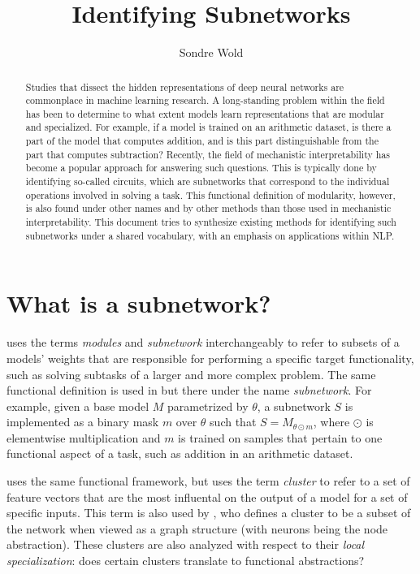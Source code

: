 \documentclass[11pt]{article}
\title{Identifying Subnetworks}
\author{Sondre Wold}
\begin{document}
\maketitle

\begin{abstract}
\noindent
Studies that dissect the hidden representations of deep neural networks are commonplace in machine learning research. A long-standing problem within the field has been to determine to what extent models learn representations that are modular and specialized. For example, if a model is trained on an arithmetic dataset, is there a part of the model that computes addition, and is this part  distinguishable from the part that computes subtraction? Recently, the field of mechanistic interpretability has become a popular approach for answering such questions. This is typically done by identifying so-called circuits, which are subnetworks that correspond to the individual operations involved in solving a task. This functional definition of modularity, however, is also found under other names and by other methods than those used in mechanistic interpretability. This document tries to synthesize existing methods for identifying such subnetworks under a shared vocabulary, with an emphasis on applications within NLP.
\end{abstract}

\section{What is a subnetwork?}

\citet{csordas2020neural} uses the terms \textit{modules} and \textit{subnetwork} interchangeably to refer to subsets of a models' weights that are responsible for performing a specific target functionality, such as solving subtasks of a larger and more complex problem. The same functional definition is used in \citet{lepori2023break} but there under the name \textit{subnetwork}. For example, given a base model $M$ parametrized by $\theta$, a subnetwork $S$ is implemented as a binary mask $m$ over $\theta$ such that $S=M_{\theta \odot m}$, where $\odot$ is elementwise multiplication and $m$ is trained on samples that pertain to one functional aspect of a task, such as addition in an arithmetic dataset.

\citet{watanabe2019interpreting} uses the same functional framework, but uses the term \textit{cluster} to refer to a set of feature vectors that are the most influental on the output of a model for a set of specific inputs. This term is also used by \citet{casper2022graphical}, who defines a cluster to be a subset of the network when viewed as a graph structure (with neurons being the node abstraction). These clusters are also analyzed with respect to their \textit{local specialization}: does certain clusters translate to functional abstractions?
\end{document}
